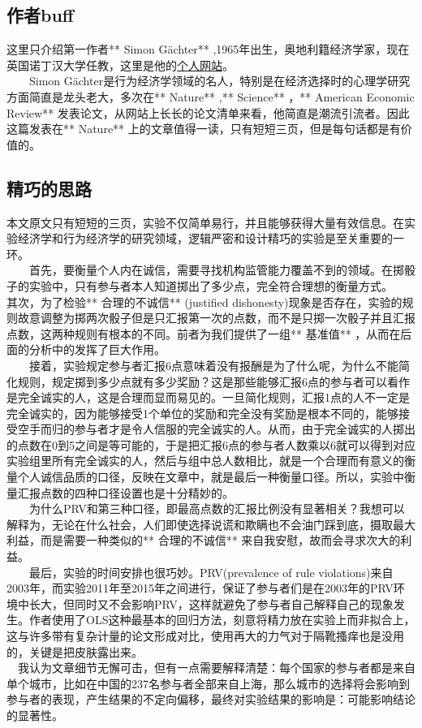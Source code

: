 \documentclass[11pt]{article}
\begin{document}
    \subsection{作者buff}\label{ux4f5cux8005buff}

    这里只介绍第一作者** Simon Gächter**
,1965年出生，奥地利籍经济学家，现在英国诺丁汉大学任教，这里是他的\href{http://www.nottingham.ac.uk/~lezsg1/personalpage.htm}{个人网站}。\\
　　Simon
Gächter是行为经济学领域的名人，特别是在经济选择时的心理学研究方面简直是龙头老大，多次在**
Nature** ,** Science** ，** American Economic Review**
发表论文，从网站上长长的论文清单来看，他简直是潮流引流者。因此这篇发表在**
Nature** 上的文章值得一读，只有短短三页，但是每句话都是有价值的。

    \subsection{精巧的思路}\label{ux7cbeux5de7ux7684ux601dux8def}

    本文原文只有短短的三页，实验不仅简单易行，并且能够获得大量有效信息。在实验经济学和行为经济学的研究领域，逻辑严密和设计精巧的实验是至关重要的一环。\\
　　首先，要衡量个人内在诚信，需要寻找机构监管能力覆盖不到的领域。在掷骰子的实验中，只有参与者本人知道掷出了多少点，完全符合理想的衡量方式。\\
其次，为了检验** 合理的不诚信** (justified
dishonesty)现象是否存在，实验的规则故意调整为掷两次骰子但是只汇报第一次的点数，而不是只掷一次骰子并且汇报点数，这两种规则有根本的不同。前者为我们提供了一组**
基准值** ，从而在后面的分析中的发挥了巨大作用。\\
　　接着，实验规定参与者汇报6点意味着没有报酬是为了什么呢，为什么不能简化规则，规定掷到多少点就有多少奖励？这是那些能够汇报6点的参与者可以看作是完全诚实的人，这是合理而显而易见的。一旦简化规则，汇报1点的人不一定是完全诚实的，因为能够接受1个单位的奖励和完全没有奖励是根本不同的，能够接受空手而归的参与者才是令人信服的完全诚实的人。从而，由于完全诚实的人掷出的点数在0到5之间是等可能的，于是把汇报6点的参与者人数乘以6就可以得到对应实验组里所有完全诚实的人，然后与组中总人数相比，就是一个合理而有意义的衡量个人诚信品质的口径，反映在文章中，就是最后一种衡量口径。所以，实验中衡量汇报点数的四种口径设置也是十分精妙的。\\
　　为什么PRV和第三种口径，即最高点数的汇报比例没有显著相关？我想可以解释为，无论在什么社会，人们即使选择说谎和欺瞒也不会油门踩到底，摄取最大利益，而是需要一种类似的**
合理的不诚信** 来自我安慰，故而会寻求次大的利益。\\
　　最后，实验的时间安排也很巧妙。PRV(prevalence of rule
violations)来自2003年，而实验2011年至2015年之间进行，保证了参与者们是在2003年的PRV环境中长大，但同时又不会影响PRV，这样就避免了参与者自己解释自己的现象发生。作者使用了OLS这种最基本的回归方法，刻意将精力放在实验上而非拟合上，这与许多带有复杂计量的论文形成对比，使用再大的力气对于隔靴搔痒也是没用的，关键是把皮肤露出来。\\
　我认为文章细节无懈可击，但有一点需要解释清楚：每个国家的参与者都是来自单个城市，比如在中国的237名参与者全部来自上海，那么城市的选择将会影响到参与者的表现，产生结果的不定向偏移，最终对实验结果的影响是：可能影响结论的显著性。
\end{document}
